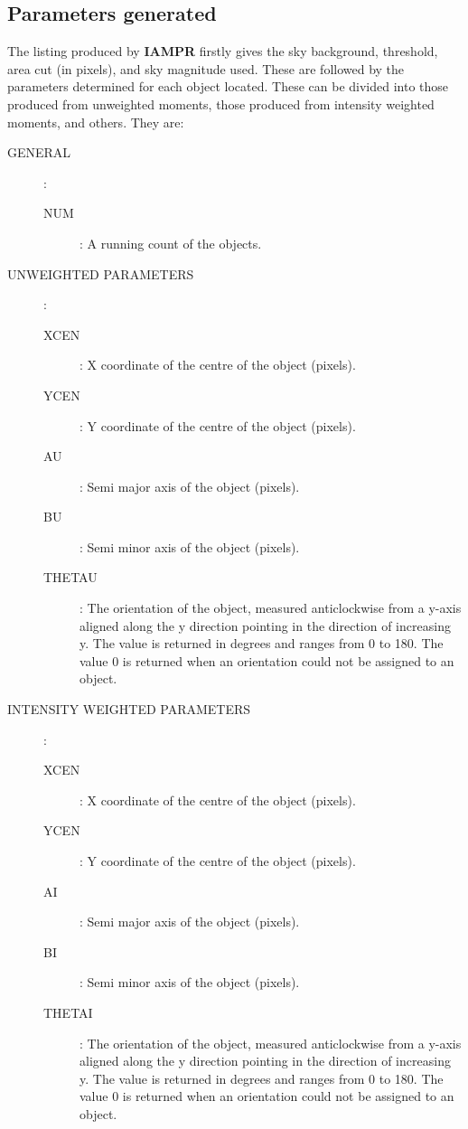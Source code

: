 \subsection {Parameters generated}
The listing produced by {\bf IAMPR} firstly gives the sky background, threshold,
area cut (in pixels), and sky magnitude used.
These are followed by the parameters determined for each object located.
These can be divided into those produced from unweighted moments, those produced
from intensity weighted moments, and others.
They are:
\begin{description}
\item [GENERAL]:
\begin{description}
\item [NUM]: A running count of the objects.
\end{description}
\item [UNWEIGHTED PARAMETERS]:
\begin{description}
\item [XCEN]: X coordinate of the centre of the object (pixels).
\item [YCEN]: Y coordinate of the centre of the object (pixels).
\item [AU]: Semi major axis of the object (pixels).
\item [BU]: Semi minor axis of the object (pixels).
\item [THETAU]: The orientation of the object, measured anticlockwise from a
y-axis aligned along the y direction pointing in the direction of increasing y.
The value is returned in degrees and ranges from 0 to 180.
The value 0 is returned when an orientation could not be assigned to an object.
\end{description}
\item [INTENSITY WEIGHTED PARAMETERS]:
\begin{description}
\item [XCEN]: X coordinate of the centre of the object (pixels).
\item [YCEN]: Y coordinate of the centre of the object (pixels).
\item [AI]: Semi major axis of the object (pixels).
\item [BI]: Semi minor axis of the object (pixels).
\item [THETAI]: The orientation of the object, measured anticlockwise from a
y-axis aligned along the y direction pointing in the direction of increasing y.
The value is returned in degrees and ranges from 0 to 180.
The value 0 is returned when an orientation could not be assigned to an object.

\end{description}
\end{description}
